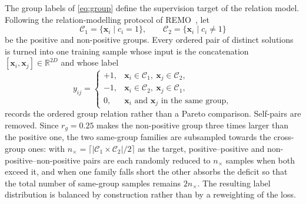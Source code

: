 \documentclass[11pt,a4paper]{article}
\newcommand{\vx}{\mathbf{x}}
\begin{document}
The group labels of \eqref{eq:group} define the supervision target of the
relation model. Following the relation-modelling protocol of
REMO~\cite{ref:remo}, let
\begin{equation}
\mathcal{C}_1=\{\vx_i\mid c_i=1\},
\qquad
\mathcal{C}_2=\{\vx_i\mid c_i\neq1\}
\label{eq:groups}
\end{equation}
be the positive and non-positive groups. Every ordered pair of distinct
solutions is turned into one training sample whose input is the concatenation
$[\vx_i,\vx_j]\in\mathbb{R}^{2D}$ and whose label
\begin{equation}
y_{ij}=
\begin{cases}
+1, & \vx_i\in\mathcal{C}_1,\ \vx_j\in\mathcal{C}_2,\\
-1, & \vx_i\in\mathcal{C}_2,\ \vx_j\in\mathcal{C}_1,\\
0,  & \text{$\vx_i$ and $\vx_j$ in the same group},
\end{cases}
\label{eq:pairlabel}
\end{equation}
records the ordered group relation rather than a Pareto comparison. Self-pairs
are removed. Since $r_g=0.25$ makes the non-positive group three times larger
than the positive one, the two same-group families are subsampled towards the
cross-group ones: with $n_{\times}=\lceil|\mathcal{C}_1\times\mathcal{C}_2|/2
\rceil$ as the target, positive--positive and non-positive--non-positive pairs
are each randomly reduced to $n_{\times}$ samples when both exceed it, and when
one family falls short the other absorbs the deficit so that the total number of
same-group samples remains $2n_{\times}$. The resulting label distribution is
balanced by construction rather than by a reweighting of the loss.
\end{document}
